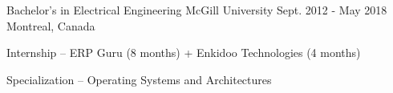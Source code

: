 

\begin{cventries}

  \cventry
    {Bachelor's in Electrical Engineering} %
    {McGill University} %
    {Sept. 2012 - May 2018} %
    {Montreal, Canada} %
    {
      \begin{cvitems} %
        \item {Internship – ERP Guru (8 months) + Enkidoo Technologies (4 months)}
        \item {Specialization – Operating Systems and Architectures}
      \end{cvitems}
    }

\end{cventries}

